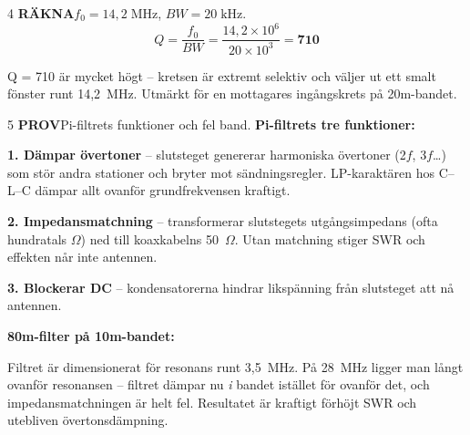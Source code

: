 \documentclass[a4paper,11pt,twoside]{book}
\newcommand{\qrakna}{\colorbox{bluepale}{\textcolor{bluedark}{\headingfont\bfseries\tiny RÄKNA}}}
\newcommand{\qprov}{\colorbox{redpale}{\textcolor{reddark}{\headingfont\bfseries\tiny PROV}}}
\begin{document}
\begin{facitblock}{4}
\qrakna\quad $f_0 = 14{,}2\;\text{MHz}$, $BW = 20\;\text{kHz}$.
\tcblower
\[
Q = \frac{f_0}{BW}
  = \frac{14{,}2\times10^6}{20\times10^3}
  = \mathbf{710}
\]

Q = 710 är mycket högt -- kretsen är extremt selektiv och väljer ut
ett smalt fönster runt 14,2~MHz. Utmärkt för en mottagares
ingångskrets på 20m-bandet.
\end{facitblock}

\begin{facitblock}{5}
\qprov\quad Pi-filtrets funktioner och fel band.
\tcblower
\textbf{Pi-filtrets tre funktioner:}

\textbf{1. Dämpar övertoner} -- slutsteget genererar harmoniska
övertoner (2$f$, 3$f$\ldots) som stör andra stationer och bryter
mot sändningsregler. LP-karaktären hos C--L--C dämpar allt ovanför
grundfrekvensen kraftigt.

\textbf{2. Impedansmatchning} -- transformerar slutstegets
utgångsimpedans (ofta hundratals $\Omega$) ned till koaxkabelns
50~$\Omega$. Utan matchning stiger SWR och effekten når inte antennen.

\textbf{3. Blockerar DC} -- kondensatorerna hindrar likspänning från
slutsteget att nå antennen.

\medskip
\textbf{80m-filter på 10m-bandet:}

Filtret är dimensionerat för resonans runt 3,5~MHz. På 28~MHz ligger
man långt ovanför resonansen -- filtret dämpar nu \emph{i} bandet
istället för ovanför det, och impedansmatchningen är helt fel.
Resultatet är kraftigt förhöjt SWR och utebliven övertonsdämpning.
\end{facitblock}
\end{document}

